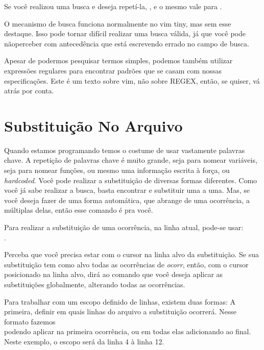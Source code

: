 Se você realizou uma busca e deseja repetí-la, \vimcommand{//}, e o mesmo vale para .

O mecanismo de busca funciona normalmente no vim tiny, mas sem esse destaque.
Isso pode tornar difícil realizar uma busca válida, já que você pode nãoperceber com antecedência
que está escrevendo errado no campo de busca.


Apesar de podermos pesquisar termos simples, podemos também utilizar expressões regulares para encontrar padrões que se casam com nossas especificações.
Este é um texto sobre vim, não sobre REGEX, então, se quiser, vá atrás por conta.

\section{Substituição No Arquivo}
Quando estamos programando temos o costume de usar vastamente palavras chave.
A repetição de palavras chave é muito grande, seja para nomear variáveis, seja para nomear funções,
ou mesmo uma informação escrita à força, ou \textit{hardcoded}.
Você pode realizar a substituição de diversas formas diferentes.
Como você já sabe realizar a busca, basta encontrar e substituir uma a uma.
Mas, se você deseja fazer de uma forma automática, que abrange de uma ocorrência, a múltiplas delas, então esse comando é pra você.

Para realizar a substituição de uma ocorrência, na linha atual, pode-se usar:\\
.



Perceba que você precisa estar com o cursor na linha alvo da substituição.
Se sua substituição tem como alvo todas as ocorrências de \textit{ocorr}, então,
com o cursor posicionado na linha alvo,  dirá ao comando que
você deseja aplicar as substituições globalmente, alterando todas as ocorrências.

Para trabalhar com um escopo definido de linhas, existem duas formas: A primeira,
definir em quais linhas do arquivo a substituição ocorrerá.
Nesse formato fazemos \\
podendo aplicar na primeira ocorrência, ou em todas elas adicionando  ao final.
Neste exemplo, o escopo será da linha 4 à linha 12.


